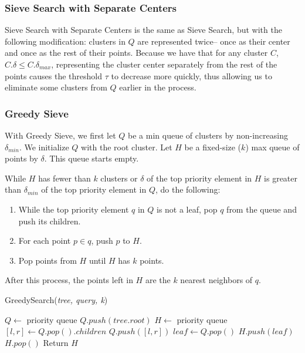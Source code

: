 \subsubsection{Sieve Search with Separate Centers}
\label{subsubsec:methods:knn-search:sieve2}
Sieve Search with Separate Centers is the same as Sieve Search, but with the following modification: clusters 
in $Q$ are represented twice-- once as their center and once as the rest of their points. 
Because we have that for any cluster $C$, $C.\delta \leq C.\delta_{max}$, representing the cluster 
center separately from the rest of the points causes the threshold $\tau$ to decrease more quickly, 
thus allowing us to eliminate some clusters from $Q$ earlier in the process.


\subsubsection{Greedy Sieve}
\label{subsubsec:methods:knn-search:greedy-search}

With Greedy Sieve, we first let $Q$ be a min queue of clusters by non-increasing $\delta_{min}$. We initialize $Q$ with the root cluster.
Let $H$ be a fixed-size ($k$) max queue of points by $\delta$. This queue starts empty.

While $H$ has fewer than $k$ clusters or $\delta$ of the top priority element in $H$ is greater 
than $\delta_{min}$ of the top priority element in $Q$, do the following:
\begin{enumerate}
\item While the top priority element $q$ in $Q$ is not a leaf, pop $q$ from the queue and push its children.
\item For each point $p \in q$, push $p$ to $H$. 
\item Pop points from $H$ until $H$ has $k$ points. 
\end{enumerate}
After this process, the points left in $H$ are the $k$ nearest neighbors of $q$.

\begin{algorithm} 
\caption{GreedySearch(\emph{tree, query, k})} 
\label{alg:greedy_search} 
\begin{algorithmic}[3]
    \STATE $Q \leftarrow$ priority queue
    \STATE $Q.push(tree.root)$
    \STATE $H \leftarrow$ priority queue
            \STATE $[l, r] \leftarrow Q.pop().children$
            \STATE $Q.push([l, r])$
        \ENDWHILE
        \STATE $leaf \leftarrow Q.pop()$
        \STATE $H.push(leaf)$
            \STATE $H.pop()$
        \ENDWHILE
    \ENDWHILE
    \STATE Return $H$
\end{algorithmic}
\end{algorithm}

